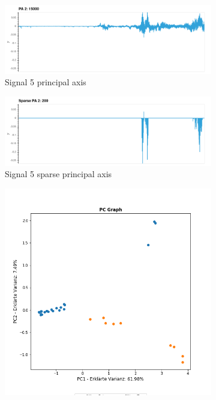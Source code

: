 \begin{figure}
\centering
\begin{subfigure}{0.9\textwidth}
\includegraphics[width=\textwidth]{figures/Signal_5_principal_axis.png}
\caption{Signal 5 principal axis}
\end{subfigure}
%
\begin{subfigure}{0.9\textwidth}
\includegraphics[width=\textwidth]{figures/Signal_5_sparse_principal_axis.png}
\caption{Signal 5 sparse principal axis}
\end{subfigure}
%
\begin{subfigure}{0.45\textwidth}
\centering
\includegraphics[width = \textwidth]{figures/Signal_5_pc_graph.png}

\end{subfigure}
\end{figure}
